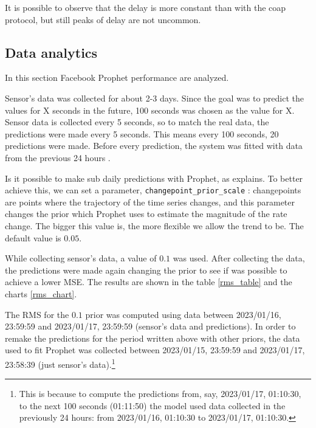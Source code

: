 \documentclass[]{article}
\begin{document}
\begin{figure}[h]
\begin{subfigure}{0.5\textwidth}
		\caption{}
		\label{fig:http1000ms}
	\end{subfigure}
	
\end{figure}

It is possible to observe that the delay is more constant than with the coap protocol, but still peaks of delay are not uncommon. 

\subsection{Data analytics}
In this section Facebook Prophet performance are analyzed. 

Sensor's data was collected for about 2-3 days. Since the goal was to predict the values for X seconds in the future, 100 seconds was chosen as the value for X. Sensor data is collected every 5 seconds, so to match the real data, the predictions were made every 5 seconds. This means every 100 seconds, 20 predictions were made. Before every prediction, the system was fitted with data from the previous 24 hours .

Is it possible to make sub daily predictions with Prophet, as \cite{prophet:subdaily} explains. To better achieve this, we can set a parameter, \texttt{changepoint\_prior\_scale} \cite{prophet:trend_flex}: changepoints are points where the trajectory of the time series changes, and this parameter changes the prior which Prophet uses to estimate the magnitude of the rate change. The bigger this value is, the more flexible we allow the trend to be. The default value is $ 0.05 $.

While collecting sensor's data, a value of $ 0.1 $ was used. After collecting the data, the predictions were made again changing the prior to see if was possible to achieve a lower MSE. The results are shown in the table \ref{rms_table} and the charts \ref{rms_chart}.

The RMS for the $ 0.1 $ prior was computed using data between 2023/01/16, 23:59:59 and 2023/01/17, 23:59:59 (sensor's data and predictions). In order to remake the predictions for the period written above with other priors, the data used to fit Prophet was collected between 2023/01/15, 23:59:59 and 2023/01/17, 23:58:39 (just sensor's data).\footnote{This is because to compute the predictions from, say, 2023/01/17, 01:10:30, to the next 100 seconds (01:11:50) the model used data collected in the previously 24 hours: from 2023/01/16, 01:10:30 to 2023/01/17, 01:10:30.}
\end{document}
